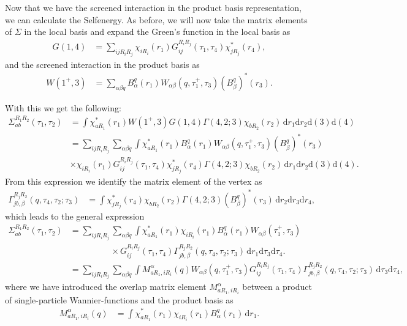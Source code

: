 \documentclass[12pt,a4paper]{scrartcl}
\numberwithin{equation}{section}
\begin{document}
Now that we have the screened interaction in the product
basis representation, we can calculate the Selfenergy.
As before, we will now take the matrix elements of $\Sigma$ in the local
basis and expand the Green's function in the local basis as
\begin{align}
 G(1,4)  
 &= \sum_{ijR_iR_j} \chi_{iR_i}(r_1) G^{R_iR_j}_{ij}(\tau_1,\tau_4) \chi^*_{jR_j}(r_4),
\end{align}
and the screened interaction in the product basis as
\begin{align}
 W(1^+,3)  
 &= \sum_{\alpha\beta q} B^q_{\alpha}(r_1) W_{\alpha\beta}(q,\tau_1^+,\tau_3) 
     (B^q_{\beta})^*(r_3).
\end{align}

With this we get the following:
\begin{align}
\Sigma^{R_1R_2}_{ab}(\tau_1,\tau_2)
&= \int \chi^*_{aR_1}(r_1) W(1^+,3) G(1,4) \Gamma(4,2;3) \chi_{bR_2}(r_2) 
                                             \,\mathrm{d}r_1\mathrm{d}r_2 \mathrm{d}(3)\mathrm{d}(4) \\
%
&= \sum_{ijR_iR_j}\sum_{\alpha\beta q}
   \int \chi^*_{aR_1}(r_1) B^q_{\alpha}(r_1) W_{\alpha\beta}(q,\tau_1^+,\tau_3) (B^q_{\beta})^*(r_3) \nonumber\\
  &\times \chi_{iR_i}(r_1) G^{R_iR_j}_{ij}(\tau_1,\tau_4) \chi^*_{jR_j}(r_4)
   \Gamma(4,2;3) \chi_{bR_2}(r_2) \,\mathrm{d}r_1\mathrm{d}r_2 \mathrm{d}(3)\mathrm{d}(4) .
\end{align}
From this expression we identify the matrix element of the 
vertex as
\begin{align}
\Gamma^{R_jR_2}_{jb,\beta}(q,\tau_4,\tau_2;\tau_3)
&= \int \chi^*_{jR_j}(r_4) \chi_{bR_2}(r_2) \Gamma(4,2;3) (B^q_{\beta})^*(r_3)
    \,\mathrm{d}r_2\mathrm{d}r_3 \mathrm{d}r_4,
\end{align}
which leads to the general expression
\begin{align}
\Sigma^{R_1R_2}_{ab}(\tau_1,\tau_2)
%
&= \sum_{ijR_iR_j}\sum_{\alpha\beta q}
   \int \chi^*_{aR_1}(r_1)\chi_{iR_i}(r_1) B^q_{\alpha}(r_1) W_{\alpha\beta}(\tau_1^+,\tau_3)  \nonumber\\
  & \hspace{2cm}\times  G^{R_iR_j}_{ij}(\tau_1,\tau_4) 
   \Gamma^{R_jR_2}_{jb,\beta}(q,\tau_4,\tau_2;\tau_3)  \,\mathrm{d}r_1 \mathrm{d}\tau_3\mathrm{d}\tau_4 .\\
%
&= \sum_{ijR_iR_j}\sum_{\alpha\beta q}
   \int M^{\alpha}_{aR_1,iR_i}(q) W_{\alpha\beta}(q,\tau_1^+,\tau_3)  
   G^{R_iR_j}_{ij}(\tau_1,\tau_4) 
   \Gamma^{R_jR_2}_{jb,\beta}(q,\tau_4,\tau_2;\tau_3)  \, \mathrm{d}\tau_3\mathrm{d}\tau_4 ,
\end{align}
where we have introduced the overlap matrix element $M^{\alpha}_{aR_1,iR_i}$
between a product of single-particle Wannier-functions
and the product basis as
\begin{align}
 M^{\alpha}_{aR_1,iR_i}(q)
 &= \int \chi^*_{aR_1}(r_1)\chi_{iR_i}(r_1) B^q_{\alpha}(r_1) \, \mathrm{d}r_1.
\end{align}
\end{document}
